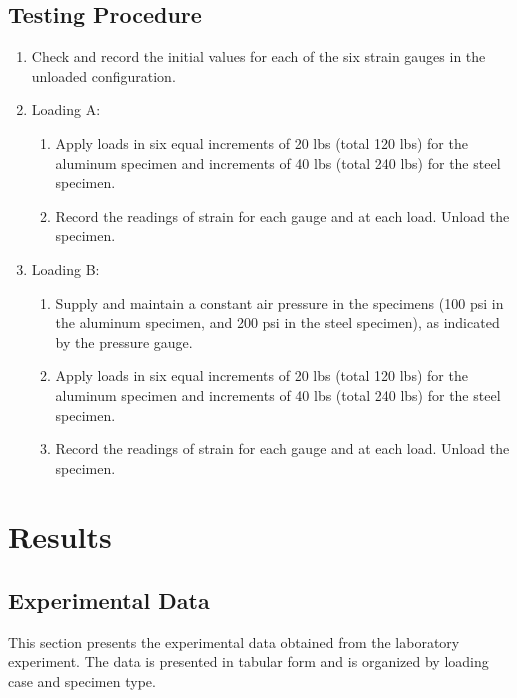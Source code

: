 \documentclass[12pt, titlepage]{article}
\begin{document}
\subsection{Testing Procedure}
\begin{enumerate}
    \item Check and record the initial values for each of the six strain gauges
      in the unloaded configuration.
    \item Loading A:
    \begin{enumerate}
        \item Apply loads in six equal increments of 20 lbs (total 120 lbs) for
          the aluminum specimen and increments of 40 lbs (total 240 lbs) for
          the steel specimen.
        \item Record the readings of strain for each gauge and at each load.
          Unload the specimen.
    \end{enumerate}
    \item Loading B:
    \begin{enumerate}
        \item Supply and maintain a constant air pressure in the specimens (100
          psi in the aluminum specimen, and 200 psi in the steel specimen), as
          indicated by the pressure gauge.
        \item Apply loads in six equal increments of 20 lbs (total 120 lbs) for
          the aluminum specimen and increments of 40 lbs (total 240 lbs) for
          the steel specimen.
        \item Record the readings of strain for each gauge and at each load.
          Unload the specimen.
    \end{enumerate}
\end{enumerate}
\newpage
\section{Results}

\subsection{Experimental Data}
This section presents the experimental data obtained from the laboratory
experiment. The data is presented in tabular form and is organized by loading
case and specimen type.
\end{document}
